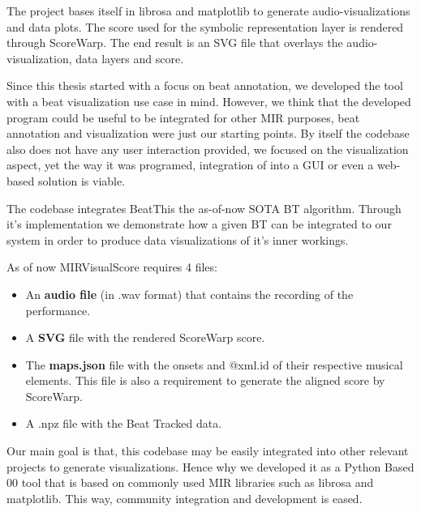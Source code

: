 The project bases itself in librosa and matplotlib to generate audio-visualizations and data plots. The score used for the symbolic representation layer is rendered through ScoreWarp. The end result is an SVG file that overlays the audio-visualization, data layers and score.

Since this thesis started with a focus on beat annotation, we developed the tool with a beat visualization use case in mind. However, we think that the developed program could be useful to be integrated for other MIR purposes, beat annotation and visualization were just our starting points. By itself the codebase also does not have any user interaction provided, we focused on the visualization aspect, yet the way it was programed, integration of into a GUI or even a web-based solution is viable. 

The codebase integrates BeatThis the as-of-now SOTA BT algorithm. Through it's implementation we demonstrate how a given BT can be integrated to our system in order to produce data visualizations of it's inner workings.  

As of now MIRVisualScore requires 4 files:
\begin{itemize}
    \item An \textbf{audio file} (in .wav format) that contains the recording of the performance.
    \item A \textbf{SVG} file with the rendered ScoreWarp score.
    \item The \textbf{maps.json} file with the onsets and @xml.id of their respective musical elements. This file is also a requirement to generate the aligned score by ScoreWarp. 
    \item A .npz file with the Beat Tracked data. 

\end{itemize}

Our main goal is that, this codebase may be easily integrated into other relevant projects to generate visualizations. Hence why we developed it as a Python Based 00 tool that is based on commonly used MIR libraries such as librosa and matplotlib. This way, community integration and development is eased. 